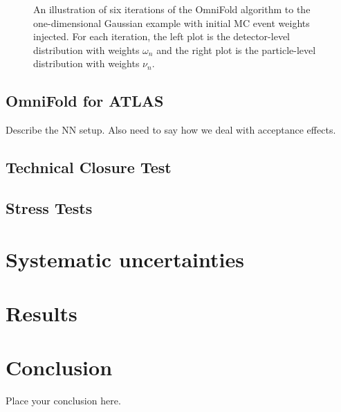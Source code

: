 \documentclass[NOTE, atlasdraft=true, texlive=2016, UKenglish]{\ATLASLATEXPATH atlasdoc}
\begin{document}
\begin{figure}[h!]
\caption{An illustration of six iterations of the OmniFold algorithm to the one-dimensional Gaussian example with initial MC event weights injected.  For each iteration, the left plot is the detector-level distribution with weights $\omega_n$ and the right plot is the particle-level distribution with weights $\nu_n$.}
\label{fig:gaussian:MCiterations}
\end{figure}


\subsection{OmniFold for ATLAS}

Describe the NN setup.  Also need to say how we deal with acceptance effects.

\subsection{Technical Closure Test}

\subsection{Stress Tests}

\section{Systematic uncertainties}
\label{sec:uncerts}



\section{Results}
\label{sec:result}

\section{Conclusion}
\label{sec:conclusion}

Place your conclusion here.


\printbibliography
%
%
\end{document}
